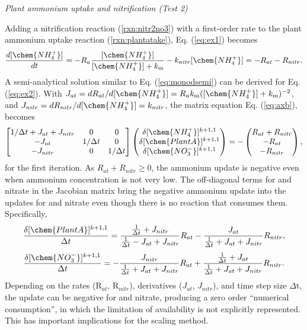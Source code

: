 \documentclass[gmd, manuscript]{copernicus}
\begin{document}
\noindent \emph{Plant ammonium uptake and nitrification (Test 2)}

Adding a nitrification reaction (\ref{rxn:nitr2no3}) with a first-order rate to
the plant ammonium uptake reaction (\ref{rxn:plantatake}),
Eq. (\ref{eq:ex1}) becomes
\begin{equation}
\frac{d[\chem{NH_4^+}]}{dt} =- R_a
\frac{[\chem{NH_4^+}]}{[\chem{NH_4^+}]+k_\text{m}}
- k_{nitr} [\chem{NH_4^+}] = -R_{at} - R_{nitr}.
\label{eq:ex2}
\end{equation}
A semi-analytical solution similar to Eq. (\ref{eq:monodsemi}) can be derived for Eq. (\ref{eq:ex2}). With $J_{at} =
dR_{at}/d[\chem{NH_4^+}] = R_ak_\text{m}([\chem{NH_4^+}] +
k_\text{m})^{-2}$, and $J_{nitr} = dR_{nitr}/d[\chem{NH_4^+}]=k_{nitr}$,
the matrix
equation Eq. (\ref{eq:axb}), becomes 
\begin{equation}
\left[
\begin{matrix}
1/\Delta t + J_{at} + J_{nitr} & 0 & 0 \\
-J_{at} & 1/\Delta t & 0 \\
-J_{nitr} & 0 & 1/\Delta t \\
\end{matrix}
\right]
\left(
\begin{matrix}
\delta [\chem{NH_4^+}]^{k+1,1} \\
\delta [\chem{PlantA}]^{k+1,1} \\
\delta [\chem{NO_3^-}]^{k+1,1} 
\end{matrix}
\right)
=-
\left(
\begin{matrix}
R_{at} + R_{nitr} \\
-R_{at} \\
-R_{nitr} 
\end{matrix}
\right),
\label{eq:test2}
\end{equation}
for the first iteration. As $R_{at} + R_{nitr} \geq 0$, the ammonium update is
negative even when ammonium concentration is not very low. 
The off-diagonal terms for  and nitrate in the Jacobian matrix
bring the negative ammonium update into the updates for  and
nitrate even though there is no reaction that consumes them. Specifically, 
\begin{equation}
\frac{\delta [\chem{PlantA}]^{k+1,1}}{\Delta t} 
= \frac{\frac{1}{\Delta t} + J_{nitr}}{\frac{1}{\Delta t} - J_{at} + J_{nitr}}
R_{at} - \frac{J_{at} }{\frac{1}{\Delta t} + J_{at} + J_{nitr}} R_{nitr},
\end{equation}
\begin{equation}
\frac{\delta [\chem{NO_3^-}]^{k+1,1}}{\Delta t}
= -\frac{J_{nitr}}{\frac{1}{\Delta t} + J_{at} + J_{nitr}} R_{at} +
\frac{\frac{1}{\Delta t} + J_{at} }{\frac{1}{\Delta t} + J_{at} + J_{nitr}}
R_{nitr}.
\end{equation}
Depending on the rates
(R$_{at}$, R$_{nitr}$), derivatives ($J_{at}$, $J_{nitr}$), and time step size
$\Delta$t, the update can be negative for  and nitrate, producing
a zero order ``numerical consumption'', in which
the limitation of availability is not explicitly
represented. This has important implications for the scaling method.
\end{document}
